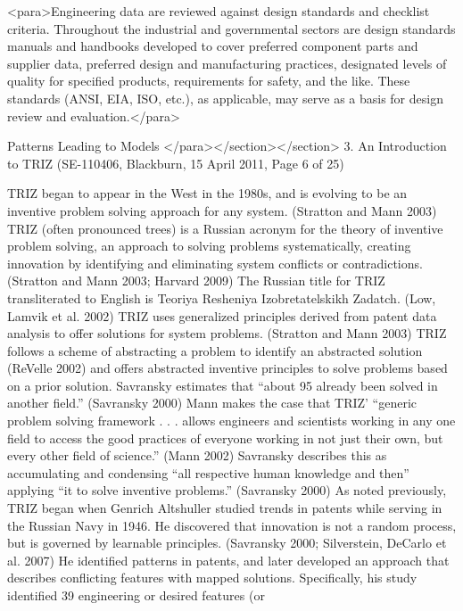 <para>Engineering data are reviewed against design standards and checklist criteria. Throughout the industrial and governmental sectors are design standards manuals and handbooks developed to cover preferred component parts and supplier data, preferred design and manufacturing practices, designated levels of quality for specified products, requirements for safety, and the like. These standards (ANSI, EIA, ISO, etc.), as applicable, may serve as a basis for design review and evaluation.</para>

Patterns Leading to Models
</para></section></section>
3. An Introduction to TRIZ (SE-110406, Blackburn, 15 April 2011, Page 6 of 25)

TRIZ began to appear in the West in the 1980s, and is evolving to be an inventive problem
solving approach for any system. (Stratton and Mann 2003) TRIZ (often pronounced trees) is a
Russian acronym for the theory of inventive problem solving, an approach to solving problems
systematically, creating innovation by identifying and eliminating system conflicts or
contradictions. (Stratton and Mann 2003; Harvard 2009) The Russian title for TRIZ
transliterated to English is Teoriya Resheniya Izobretatelskikh Zadatch. (Low, Lamvik et al.
2002) TRIZ uses generalized principles derived from patent data analysis to offer solutions for
system problems. (Stratton and Mann 2003)
TRIZ follows a scheme of abstracting a problem to identify an abstracted solution (ReVelle
2002) and offers abstracted inventive principles to solve problems based on a prior solution.
Savransky estimates that “about 95%
already been solved in another field.” (Savransky 2000) Mann makes the case that TRIZ’
 “generic problem solving framework . . . allows engineers and scientists working in any one field to access the good practices of everyone working in not just their own, but every other field of science.” (Mann 2002) Savransky describes this as accumulating and condensing “all respective
human knowledge and then” applying “it to solve inventive problems.” (Savransky 2000)
As noted previously, TRIZ began when Genrich Altshuller studied trends in patents while
serving in the Russian Navy in 1946. He discovered that innovation is not a random process, but
is governed by learnable principles. (Savransky 2000; Silverstein, DeCarlo et al. 2007) He
identified patterns in patents, and later developed an approach that describes conflicting features
with mapped solutions. Specifically, his study identified 39 engineering or desired features (or
